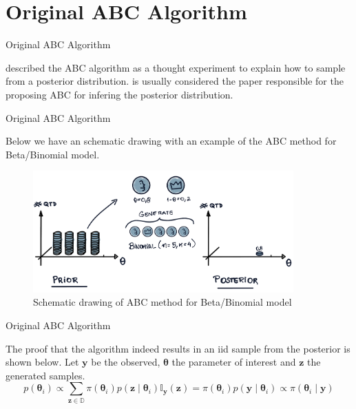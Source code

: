 \documentclass[10pt]{beamer}
\begin{document}
\AtBeginSection{}
\section[Original]{Original ABC Algorithm}
\begin{frame}[fragile]{Original ABC Algorithm}

  \citet{Rubin1984} described the ABC algorithm as a thought experiment
  to explain how to sample from a posterior distribution.
  \citet{Tavare505} is usually considered the paper responsible for the
  proposing ABC for infering the posterior distribution.

  \vspace{1cm}

\begin{algorithm}[H]
\SetAlgoLined
{}
 \caption{Original ABC method}
\end{algorithm}


\end{frame}

\begin{frame}[fragile]{Original ABC Algorithm}

  Below we have an schematic drawing with an example of
  the ABC method for Beta/Binomial model.
    \begin{figure}[H]
        \centering
        \includegraphics[width=10cm]{images/Vis-ABC.png}
        \caption{Schematic drawing of ABC method for Beta/Binomial
        model}
    \end{figure}

\end{frame}

\begin{frame}[fragile]{Original ABC Algorithm}

  The proof that the algorithm indeed results in an iid sample
  from the posterior is shown below. Let $\bm y$ be the observed,
  $\bm \theta$ the parameter of interest and $\bm z$ the generated
  samples.
  $$
  p(\bm \theta_i) \propto \sum_{\bm z \in \mathbb{D}}
  \pi(\bm \theta_i) p(\bm z \mid \bm \theta_i) \mathbb I_{\bm y}(\bm z)
  = \pi(\bm \theta_i) p(\bm y \mid \bm \theta_i) \propto
  \pi(\bm \theta_i \mid \bm y)
  $$

\end{frame}
\end{document}
